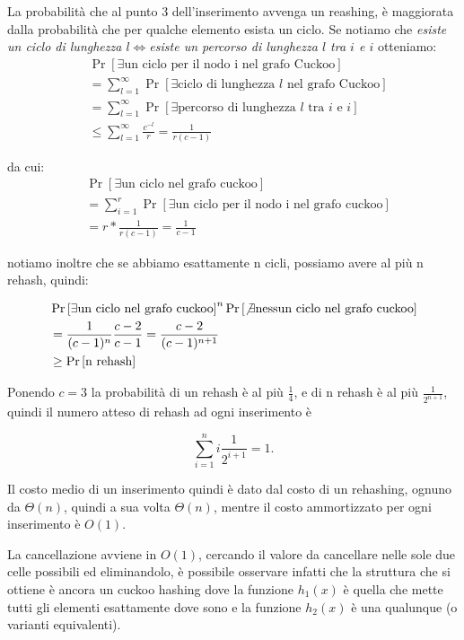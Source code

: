 La probabilità che al punto 3 dell'inserimento avvenga un reashing, è maggiorata
dalla probabilità che per qualche elemento esista un ciclo. Se notiamo che
\emph{esiste un ciclo di lunghezza $l$}$\Leftrightarrow$\emph{esiste un percorso di
lunghezza $l$ tra $i$ e $i$ } otteniamo:
\begin{align*}
    &\Pr\left[\exists \mbox{un ciclo per il nodo i nel grafo Cuckoo}\right] \\
    &= \sum_{l=1}^{\infty} \Pr\left[\exists \mbox{ciclo di lunghezza $l$ nel grafo Cuckoo}\right] \\
    &= \sum_{l=1}^{\infty} \Pr\left[\exists \mbox{percorso di lunghezza $l$ tra $i$ e $i$}\right] \\
    &\le \sum_{l=1}^{\infty} \frac{c^{-l}}{r} = \frac{1}{r(c-1)}
\end{align*}

da cui:
\begin{align*}
    &\Pr\left[\exists \mbox{un ciclo nel grafo cuckoo}\right] \\ 
    &= \sum_{i=1}^{r} \Pr\left[\exists \mbox{un ciclo per il nodo i nel grafo cuckoo}\right] \\
    &= r*\frac{1}{r(c-1)} = \frac{1}{c-1}
\end{align*}

notiamo inoltre che se abbiamo esattamente n cicli, possiamo avere al più
n rehash, quindi:

\begin{align*}
    &\Pr\left[\exists \mbox{un ciclo nel grafo cuckoo}\right]^n
        \Pr\left[\not\exists \mbox{nessun ciclo nel grafo cuckoo}\right] \\
    &= \frac{1}{(c-1)^n} \frac{c-2}{c-1} = \frac{c-2}{(c-1)^{n+1}}\\
    &\ge \Pr\left[\mbox{n rehash}\right]
\end{align*}

Ponendo $c=3$ la probabilità di un rehash è al più $\frac{1}{4}$, e di n
rehash è al più $\frac{1}{2^{n+1}}$, quindi il numero atteso di rehash ad ogni
inserimento è

\[ \sum_{i=1}^{n} i \frac{1}{2^{i+1}} = 1. \]

Il costo medio di un inserimento quindi è dato dal costo di un rehashing, 
ognuno da $\Theta(n)$, quindi a sua volta $\Theta(n)$, mentre il costo
ammortizzato per ogni inserimento è $O(1)$.

La cancellazione avviene in $O(1)$, cercando il valore da cancellare nelle sole
due celle possibili ed eliminandolo, è possibile osservare infatti che la
struttura che si ottiene è ancora un cuckoo hashing dove la funzione $h_1(x)$
è quella che mette tutti gli elementi esattamente dove sono e la funzione
$h_2(x)$ è una qualunque (o varianti equivalenti).
